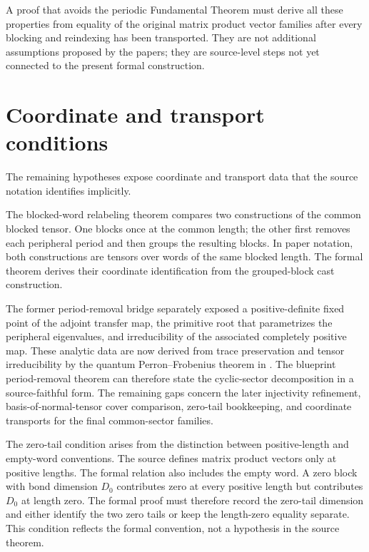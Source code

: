 \documentclass{article}
\begin{document}
A proof that avoids the periodic Fundamental Theorem must derive all these
properties from equality of the original matrix product vector families after
every blocking and reindexing has been transported. They are not additional
assumptions proposed by the papers; they are source-level steps not yet
connected to the present formal construction.

\section{Coordinate and transport conditions}

The remaining hypotheses expose coordinate and transport data that the source
notation identifies implicitly.

The blocked-word relabeling theorem compares two constructions of the common
blocked tensor. One blocks once at the common length; the other first removes
each peripheral period and then groups the resulting blocks. In paper notation,
both constructions are tensors over words of the same blocked length. The
formal theorem derives their coordinate identification from the grouped-block
cast construction.

The former period-removal bridge separately exposed a positive-definite fixed
point of the adjoint transfer map, the primitive root that parametrizes the
peripheral eigenvalues, and irreducibility of the associated completely
positive map. These analytic data are now derived from trace preservation and
tensor irreducibility by the quantum Perron--Frobenius theorem in
.
The blueprint period-removal theorem can therefore state the cyclic-sector
decomposition in a source-faithful form. The remaining gaps concern the later
injectivity refinement, basis-of-normal-tensor cover comparison, zero-tail
bookkeeping, and coordinate transports for the final common-sector families.

The zero-tail condition arises from the distinction between positive-length and
empty-word conventions. The source defines matrix product vectors only at
positive lengths. The formal relation  also
includes the empty word. A zero block with bond dimension $D_0$ contributes
zero at every positive length but contributes $D_0$ at length zero. The formal
proof must therefore record the zero-tail dimension and either identify the two
zero tails or keep the length-zero equality separate. This condition reflects
the formal convention, not a hypothesis in the source theorem.
\end{document}
